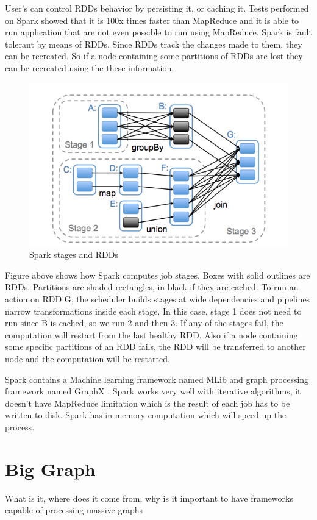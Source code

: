 \documentclass[english]{tktltiki}
\begin{document}
 User's can control RDDs behavior by persisting it, or caching it. Tests performed on Spark showed that it is 100x times faster than MapReduce and it is able to run application that are not even possible to run using MapReduce. Spark is fault tolerant by means of RDDs. Since RDDs track the changes made to them, they can be recreated. So if a node containing some partitions of RDDs are lost they can be recreated using the these information. 
 
\begin{figure}[ht!]
\centering
\includegraphics[width=130mm]{figures/rdd.png}
\caption{Spark stages and RDDs}
\end{figure}
Figure above shows how Spark computes job stages. Boxes with solid outlines are RDDs. Partitions are shaded rectangles, in black if they are cached. To run an action on RDD G, the scheduler builds stages at wide dependencies and pipelines narrow transformations inside each stage. In this case, stage 1 does not need to run since B is cached, so we run 2 and then 3. If any of the stages fail, the computation will restart from the last healthy RDD. Also if a node containing some specific partitions of an RDD fails, the RDD will be transferred to another node and the computation will be restarted. 

Spark contains a Machine learning framework named MLib and graph processing framework named GraphX . 
Spark works very well with iterative algorithms, it doesn't have MapReduce limitation which is the result of each job has to be written to disk. Spark has in memory computation which will speed up the process. 

\section{Big Graph}
What is it, where does it come from, why is it important to have frameworks capable of processing massive graphs
\end{document}
